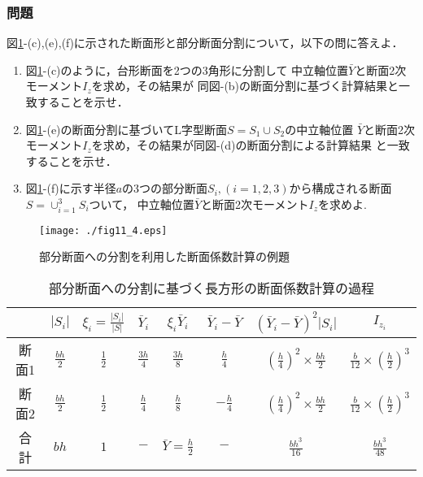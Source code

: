 \documentclass[10pt,a4j]{jarticle}
\begin{document}
\subsubsection{問題}
図\ref{fig:fig11_4}-(c),(e),(f)に示された断面形と部分断面分割について，以下の問に答えよ．
\begin{enumerate}
\item
図\ref{fig:fig11_4}-(c)のように，台形断面を2つの3角形に分割して
中立軸位置$\bar{Y}$と断面2次モーメント$I_z$を求め，その結果が
同図-(b)の断面分割に基づく計算結果と一致することを示せ．
\item
図\ref{fig:fig11_4}-(e)の断面分割に基づいてL字型断面$S=S_1\cup S_2$の中立軸位置
$\bar{Y}$と断面2次モーメント$I_z$を求め，その結果が同図-(d)の断面分割による計算結果
と一致することを示せ．
\item
図\ref{fig:fig11_4}-(f)に示す半径$a$の3つの部分断面$S_i,(i=1,2,3)$から構成される断面$S=\cup_{i=1}^3S_i$ついて，
中立軸位置$\bar{Y}$と断面2次モーメント$I_z$を求めよ.
\end{enumerate}
\begin{figure}[h]
	\begin{center}
	\texttt{[image: ./fig11\_4.eps]} 
	\end{center}
	\caption{
		部分断面への分割を利用した断面係数計算の例題
	} 
	\label{fig:fig11_4}
\end{figure}
\begin{table}
\begin{center}
	\caption{部分断面への分割に基づく長方形の断面係数計算の過程}
	\begin{tabular}{c||c|c|c|c|c|c|c}
		&
		$\left| S_i \right|$ & 
		$ \xi_i=\frac{\left| S_i \right|}{\left| S\right|} $  &
		$ \bar{Y}_i $ & 
		$ \xi_i\bar{Y}_i $ & 
		$\bar{Y}_i -\bar Y$ & 
		$ \left(\bar{Y}_i -\bar Y\right)^2\left| S_i \right|$ & 
		$ I_{z_i}$  
		\\
		\hline 
		断面1&	
		$\frac{bh}{2}$ & 
		$\frac{1}{2}$  &
		$\frac{3h}{4}$ & 
		$\frac{3h}{8}$ & 
		$\frac{h}{4}$ & 
		$\left(\frac{h}{4}\right)^2 \times \frac{bh}{2}$ & 
		$\frac{b}{12}\times \left(\frac{h}{2}\right)^3$  
		\\
		\hline
		断面2&	
		$\frac{bh}{2}$ & 
		$\frac{1}{2}$  &
		$\frac{h}{4}$ & 
		$\frac{h}{8}$ & 
		$-\frac{h}{4}$ & 
		$\left(\frac{h}{4}\right)^2 \times \frac{bh}{2}$ & 
		$\frac{b}{12}\times \left(\frac{h}{2}\right)^3$  
		\\
		\hline 
		合計&	
		$bh$ & 
		$1$  &
		$-$ & 
		$\bar Y =\frac{h}{2}$ & 
		$-$ & 
		$\frac{bh^3}{16}$ & 
		$\frac{bh^3}{48}$ 
	\end{tabular}
\label{tbl0}
\end{center}
\end{table}
\end{document}
